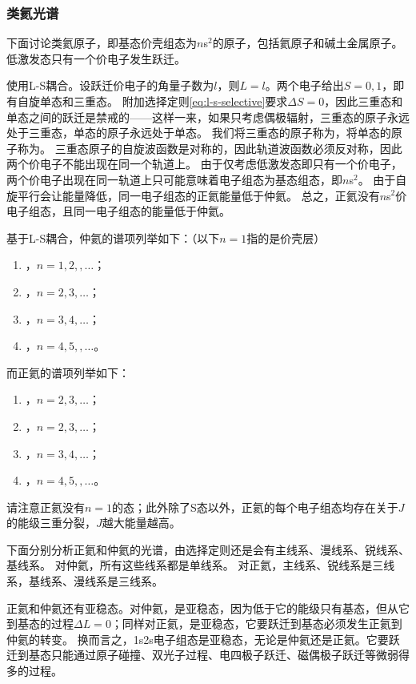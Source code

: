 \subsubsection{类氦光谱}

下面讨论类氦原子，即基态价壳组态为$n$s$^2$的原子，包括氦原子和碱土金属原子。
低激发态只有一个价电子发生跃迁。

使用L-S耦合。设跃迁价电子的角量子数为$l$，则$L=l$。两个电子给出$S=0, 1$，即有自旋单态和三重态。
附加选择定则\eqref{eq:l-s-selective}要求$\Delta S=0$，因此三重态和单态之间的跃迁是禁戒的——这样一来，如果只考虑偶极辐射，三重态的原子永远处于三重态，单态的原子永远处于单态。
我们将三重态的原子称为，将单态的原子称为。
三重态原子的自旋波函数是对称的，因此轨道波函数必须反对称，因此两个价电子不能出现在同一个轨道上。
由于仅考虑低激发态即只有一个价电子，两个价电子出现在同一轨道上只可能意味着电子组态为基态组态，即$n$s$^2$。
由于自旋平行会让能量降低，同一电子组态的正氦能量低于仲氦。
总之，正氦没有$n$s$^2$价电子组态，且同一电子组态的能量低于仲氦。

基于L-S耦合，仲氦的谱项列举如下：（以下$n=1$指的是价壳层）
\begin{enumerate}
    \item {}，$n=1, 2, ,\ldots$；
    \item {}，$n=2, 3, \ldots$；
    \item {}，$n=3, 4, \ldots$；
    \item {}，$n=4, 5, ,\ldots$。
\end{enumerate}
而正氦的谱项列举如下：
\begin{enumerate}
    \item {}，$n=2, 3,\ldots$；
    \item {}，$n=2, 3, \ldots$；
    \item {}，$n=3, 4, \ldots$；
    \item {}，$n=4, 5, ,\ldots$。
\end{enumerate}
请注意正氦没有$n=1$的态；此外除了S态以外，正氦的每个电子组态均存在关于$J$的能级三重分裂，$J$越大能量越高。

下面分别分析正氦和仲氦的光谱，由选择定则还是会有主线系、漫线系、锐线系、基线系。
对仲氦，所有这些线系都是单线系。
对正氦，主线系、锐线系是三线系，基线系、漫线系是三线系。

正氦和仲氦还有亚稳态。对仲氦，是亚稳态，因为低于它的能级只有基态，但从它到基态的过程$\Delta L = 0$；同样对正氦，是亚稳态，它要跃迁到基态必须发生正氦到仲氦的转变。
换而言之，1s2s电子组态是亚稳态，无论是仲氦还是正氦。它要跃迁到基态只能通过原子碰撞、双光子过程、电四极子跃迁、磁偶极子跃迁等微弱得多的过程。

